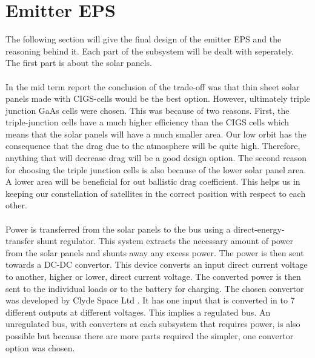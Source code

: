 \section{Emitter EPS}
\label{emitter_EPS}

The following section will give the final design of the emitter EPS and the reasoning behind it.
Each part of the subsystem will be dealt with seperately. The first part is about the solar panels.
\\\\
In the mid term report the conclusion of the trade-off was that thin sheet solar panels made with CIGS-cells would be the best option. However, ultimately triple junction GaAs cells were chosen. This was because of two reasons. First, the triple-junction cells have a much higher efficiency than the CIGS cells which means that the solar panels will have a much smaller area. Our low orbit has the consequence that the drag due to the atmosphere will be quite high. Therefore, anything that will decrease drag will be a good design option. The second reason for choosing the triple junction cells is also because of the lower solar panel area. A lower area will be beneficial for out ballistic drag coefficient. This helps us in keeping our constellation of satellites in the correct position with respect to each other.
\\\\
Power is transferred from the solar panels to the bus using a direct-energy-transfer shunt regulator. This system extracts the necessary amount of power from the solar panels and shunts away any excess power. The power is then sent towards a DC-DC convertor. This device converts an input direct current voltage to another, higher or lower, direct current voltage. The converted power is then sent to the individual loads or to the battery for charging. The chosen convertor was developed by Clyde Space Ltd \cite{ClydeSpace}. It has one input that is converted in to 7 different outputs at different voltages. This implies a regulated bus. An unregulated bus, with converters at each subsystem that requires power, is also possible but because there are more parts required the simpler, one convertor option was chosen.
\\\\
